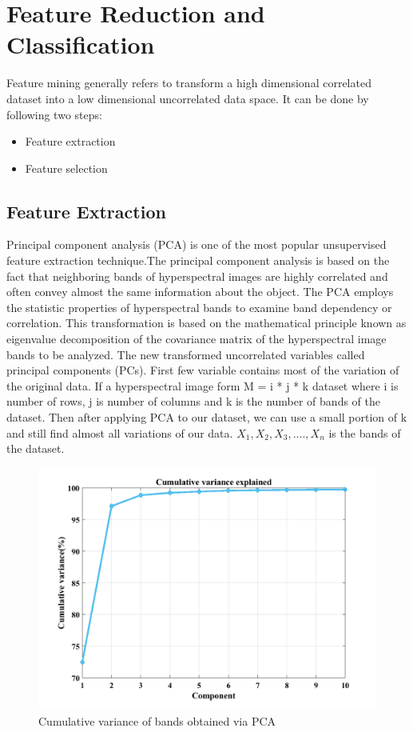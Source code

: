 \documentclass[document.tex]{subfiles}
\begin{document}
\chapter{Feature Reduction and Classification}
\noindent Feature mining generally refers to transform a high dimensional correlated dataset into a low dimensional uncorrelated data space. It can be done by following two steps:
\begin{itemize}
	\item Feature extraction
	\item Feature selection
\end{itemize}

\section{Feature Extraction}
\noindent Principal component analysis (PCA)\cite{7} is one of the most popular unsupervised feature extraction technique.The principal component analysis is based on the fact that neighboring bands of hyperspectral images are highly correlated and often convey almost the same information about the object. The PCA employs the statistic properties of
hyperspectral bands to examine band dependency or correlation. This transformation
is based on the mathematical principle known as eigenvalue decomposition of the
covariance matrix of the hyperspectral image bands to be analyzed. The new transformed uncorrelated variables called principal components (PCs). First few variable contains most of the variation of the original data. If a hyperspectral image form M = i * j * k dataset where i is number of rows, j is number of columns and k is the number of bands of the dataset. Then after applying PCA to our dataset, we can use a small portion of k and still find almost all variations of our data. $X_1,X_2,X_3,....,X_n$ is the bands of the dataset. 
\begin{figure}[H]
	\begin{center}
		\includegraphics[height=8.0cm]{imgs/variance.png}
	\end{center}
	\caption{Cumulative variance of bands obtained via PCA}
	\label{fig:Cumulative variance of bands obtained via PCA}
\end{figure}
\end{document}
